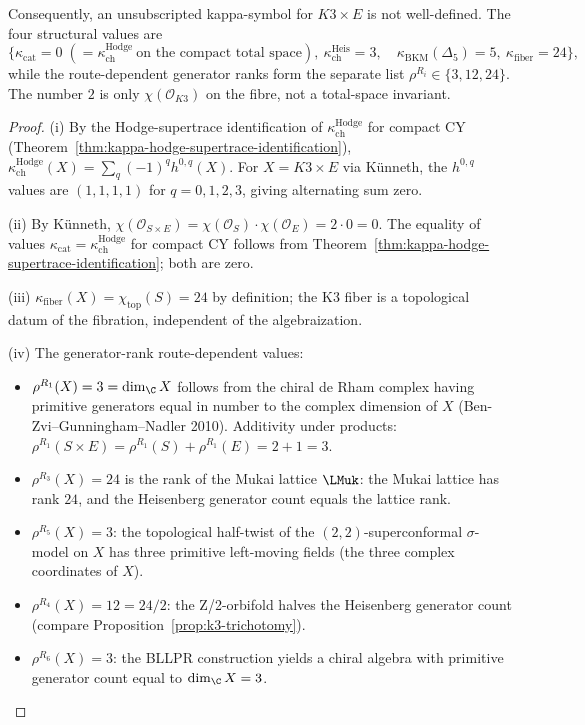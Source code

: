 \begin{theorem}
\begin{enumerate}[label=\textup{(\roman*)}]
\end{enumerate}
Consequently, an unsubscripted kappa-symbol for \(K3 \times E\) is not
well-defined. The four structural values are
\[
\{\kappa_{\mathrm{cat}} = 0\;(=\kappa_{\mathrm{ch}}^{\mathrm{Hodge}}\ \text{on the compact
total space}),\ \kappa_{\mathrm{ch}}^{\mathrm{Heis}} = 3,\quad
\kappa_{\mathrm{BKM}}(\Delta_5) = 5,\ \kappa_{\mathrm{fiber}} = 24\},
\]
while the route-dependent generator ranks form the separate list
$\rho^{R_i} \in \{3, 12, 24\}$. The number $2$ is only
$\chi(\mathcal O_{K3})$ on the fibre, not a total-space invariant.
\end{theorem}

\begin{proof}
(i) By the Hodge-supertrace identification of $\kappa_{\mathrm{ch}}^{\mathrm{Hodge}}$ for compact CY (Theorem~\ref{thm:kappa-hodge-supertrace-identification}), $\kappa_{\mathrm{ch}}^{\mathrm{Hodge}}(X) = \sum_{q}(-1)^{q} h^{0,q}(X)$. For $X = K3 \times E$ via K\"unneth, the $h^{0,q}$ values are $(1, 1, 1, 1)$ for $q = 0, 1, 2, 3$, giving alternating sum zero.

(ii) By K\"unneth, $\chi(\mathcal{O}_{S \times E}) = \chi(\mathcal{O}_S) \cdot \chi(\mathcal{O}_E) = 2 \cdot 0 = 0$. The equality of values $\kappa_{\mathrm{cat}} = \kappa_{\mathrm{ch}}^{\mathrm{Hodge}}$ for compact CY follows from Theorem~\ref{thm:kappa-hodge-supertrace-identification}; both are zero.

(iii) $\kappa_{\mathrm{fiber}}(X) = \chi_{\mathrm{top}}(S) = 24$ by definition; the K3 fiber is a topological datum of the fibration, independent of the algebraization.

(iv) The generator-rank route-dependent values:
\begin{itemize}
 \item $\rho^{R_1}(X) = 3 = \dim_\C X$ follows from the chiral de Rham complex having primitive generators equal in number to the complex dimension of $X$ (Ben-Zvi--Gunningham--Nadler 2010). Additivity under products: $\rho^{R_1}(S \times E) = \rho^{R_1}(S) + \rho^{R_1}(E) = 2 + 1 = 3$.
 \item $\rho^{R_3}(X) = 24$ is the rank of the Mukai lattice $\LMuk$: the Mukai lattice has rank $24$, and the Heisenberg generator count equals the lattice rank.
 \item $\rho^{R_5}(X) = 3$: the topological half-twist of the $(2,2)$-superconformal $\sigma$-model on $X$ has three primitive left-moving fields (the three complex coordinates of $X$).
 \item $\rho^{R_4}(X) = 12 = 24/2$: the Z/2-orbifold halves the Heisenberg generator count (compare Proposition~\ref{prop:k3-trichotomy}).
 \item $\rho^{R_6}(X) = 3$: the BLLPR construction yields a chiral algebra with primitive generator count equal to $\dim_\C X = 3$.
\end{itemize}


\end{proof}
